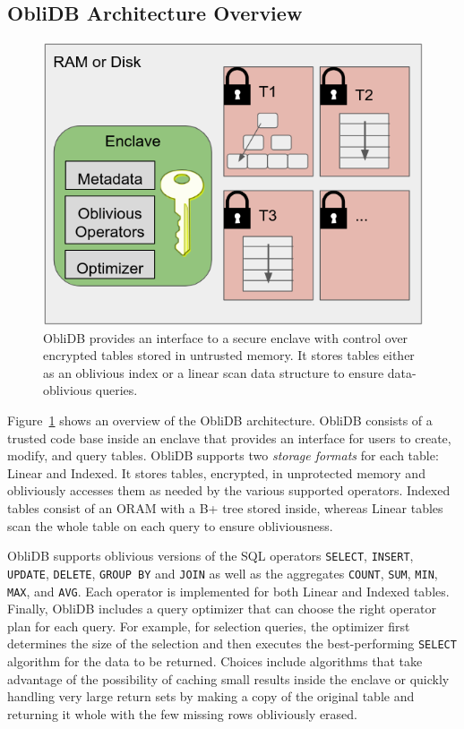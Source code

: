 \documentclass[letterpaper,twocolumn,10pt]{article}
\def\name/{ObliDB}
\begin{document}
\subsection{\name/ Architecture Overview}
\begin{figure}
\includegraphics[width=\linewidth]{figure_revised.png}
\caption{\name/ provides an interface to a secure enclave with control over encrypted tables stored in untrusted memory. It stores tables either as an oblivious index or a linear scan data structure to ensure data-oblivious queries.}
\label{arch}
\end{figure}
Figure~\ref{arch} shows an overview of the \name/ architecture. \name/ consists of a trusted code base inside an enclave that provides an interface for users to create, modify, and query tables. \name/ supports two \emph{storage formats} for each table: Linear and Indexed. It stores tables, encrypted, in unprotected memory and obliviously accesses them as needed by the various supported operators. Indexed tables consist of an ORAM with a B+ tree stored inside, whereas Linear tables scan the whole table on each query to ensure obliviousness.

  \name/ supports oblivious versions of the SQL operators \texttt{SELECT}, \texttt{INSERT}, \texttt{UPDATE}, \texttt{DELETE}, \texttt{GROUP BY} and \texttt{JOIN} as well as the aggregates \texttt{COUNT}, \texttt{SUM}, \texttt{MIN}, \texttt{MAX}, and \texttt{AVG}. Each operator is implemented for both Linear and Indexed tables. Finally, ObliDB includes a query optimizer that can choose the right operator plan for each query. For example, for selection queries, the optimizer first determines the size of the selection and then executes the best-performing \texttt{SELECT} algorithm for the data to be returned. Choices include algorithms that take advantage of the possibility of caching small results inside the enclave or quickly handling very large return sets by making a copy of the original table and returning it whole with the few missing rows obliviously erased.
  
\end{document}
